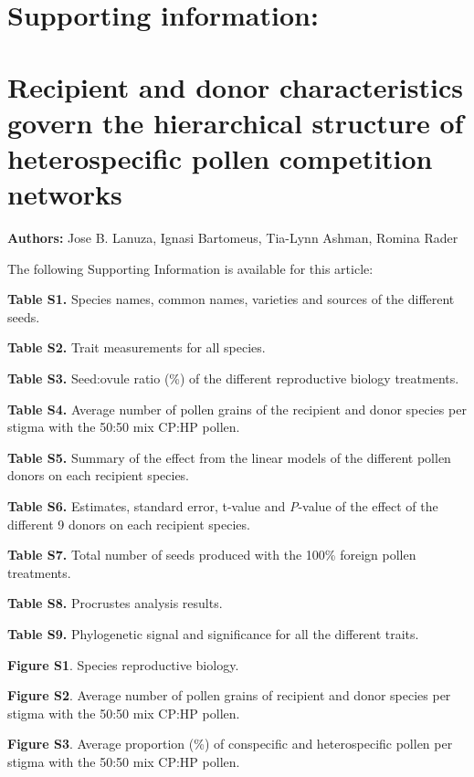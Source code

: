 \documentclass[12pt,]{article}
\author{}
\date{\vspace{-2.5em}}
\begin{document}
\captionsetup[figure]{labelformat=empty}
\captionsetup[table]{labelformat=empty} \renewcommand{\figurename}{}

\section{Supporting information:}\label{supporting-information}

\section{Recipient and donor characteristics govern the hierarchical
structure of heterospecific pollen competition
networks}\label{recipient-and-donor-characteristics-govern-the-hierarchical-structure-of-heterospecific-pollen-competition-networks}

\textbf{Authors:} Jose B. Lanuza, Ignasi Bartomeus, Tia-Lynn Ashman,
Romina Rader

The following Supporting Information is available for this article:

\textbf{Table S1.} Species names, common names, varieties and sources of
the different seeds.

\textbf{Table S2.} Trait measurements for all species.

\textbf{Table S3.} Seed:ovule ratio (\%) of the different reproductive
biology treatments.

\textbf{Table S4.} Average number of pollen grains of the recipient and
donor species per stigma with the 50:50 mix CP:HP pollen.

\textbf{Table S5.} Summary of the effect from the linear models of the
different pollen donors on each recipient species.

\textbf{Table S6.} Estimates, standard error, t-value and \emph{P}-value
of the effect of the different 9 donors on each recipient species.

\textbf{Table S7.} Total number of seeds produced with the 100\% foreign
pollen treatments.

\textbf{Table S8.} Procrustes analysis results.

\textbf{Table S9.} Phylogenetic signal and significance for all the
different traits.

\textbf{Figure S1}. Species reproductive biology.

\textbf{Figure S2}. Average number of pollen grains of recipient and
donor species per stigma with the 50:50 mix CP:HP pollen.

\textbf{Figure S3}. Average proportion (\%) of conspecific and
heterospecific pollen per stigma with the 50:50 mix CP:HP pollen.
\end{document}
